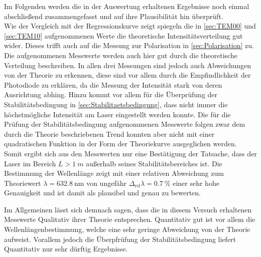 Im Folgenden werden die in der Auswertung erhaltenen Ergebnisse noch einmal abschließend zusammengefasst 
und auf ihre Plausibilität hin überprüft.\\

Wie der Vergleich mit der Regressionskurve zeigt spiegeln die in \cref{sec:TEM00} und \cref{sec:TEM10} aufgenommenen Werte 
die theoretische Intensitätsverteilung gut wider. Dieses trifft auch auf die Messung zur Polarisation in \cref{sec:Polarisation}
zu. Die aufgenommenen Messwerte werden auch hier gut durch die theoretische Verteilung beschreiben. In allen drei Messungen 
sind jedoch auch Abweichungen von der Theorie zu erkennen, diese sind vor allem durch die Empfindlichkeit der Photodiode 
zu erklären, da die Messung der Intensität stark von deren Ausrichtung abhing. Hinzu kommt vor allem für die 
Überprüfung der Stabilitätsbedingung in \cref{sec:Stabilitaetsbedingung}, dass nicht immer die höchstmögliche Intensität am Laser 
eingestellt werden konnte. Die für die Prüfung der Stabilitätsbedingung aufgenommenen Messwerte folgen zwar dem durch die Theorie
beschriebenen Trend konnten aber nicht mit einer quadratischen Funktion in der Form der Theoriekurve ausgeglichen werden.
Somit ergibt sich aus den Messwerten nur eine Bestätigung der Tatsache, dass der Laser im Bereich $L > \SI{1}{m}$ außerhalb seines
Stabilitätsbereiches ist.
Die Bestimmung der Wellenlänge zeigt mit einer relativen Abweichung zum Theoriewert $\lambda = \SI{632.8}{\nm}$ 
von ungefähr $\Delta_{\mathrm{rel}}\lambda = \SI{0.7}{\percent}$  einer sehr hohe Genauigkeit und ist damit als plausibel und genau zu bewerten.

Im Allgemeinen lässt sich demnach sagen, dass die in diesem Versuch erhaltenen Messwerte Qualitativ ihrer Theorie entsprechen.
Quantitativ gut ist vor allem die Wellenlängenbestimmung, welche eine sehr geringe Abweichung von der Theorie aufweist.
Vorallem jedoch die Überpfrüfung der Stabilitätsbedingung liefert Quantitativ nur sehr dürftig Ergebnisse. 